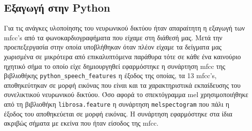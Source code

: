 \documentclass[../main.tex]{subfiles}
\begin{document}
\subsection{Eξαγωγή στην Python}
Για τις ανάγκες υλοποίησης του νευρωνικού δικτύου ήταν απαραίτητη η εξαγωγή των
mfcc's από τα φωνοκαρδιογραφήματα  που είχαμε στη διάθεσή μας. Μετά την
προεπεξεργασία στην οποία υποβλήθηκαν όταν πλέον είχαμε τα δείγματα μας
χωρισμένα σε μικρότερα από επικαλυπτόμενα παράθυρα τότε σε κάθε ένα καινούριο
ηχητικό σήμα το οποίο είχε δημιουργηθεί εφαρμόστηκε η συνάρτηση mfcc της
βιβλιοθήκης \verb|python_speech_features| η έξοδος της οποίας, τα 13 mfcc's,
αποθηκεύτηκαν σε μορφή εικόνας που είναι και τα χαρακτηριστικά εκπαίδευσης  του
συνελικτικού νευρωνικού δικτύου. Όσο αφορά το σπεκτόγραμμα mel χρησιμοποιήθηκε
από τη βιβλιοθήκη \verb|librosa.feature| η συνάρτηση \verb|melspectogram| που
πάλι η έξοδος του αποθηκεύεται σε μορφή εικόνας. Η συνάρτηση εφαρμόστηκε στα
ίδια ακριβώς σήματα με εκείνα που ήταν είσοδος της mfcc.
\end{document}
